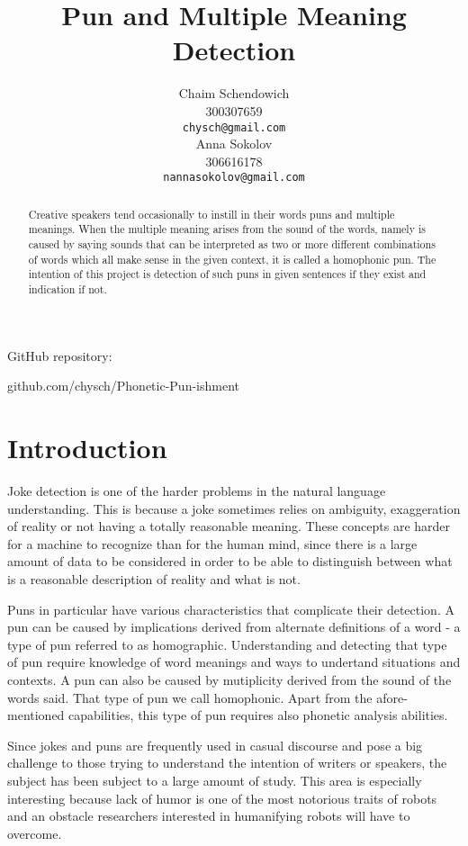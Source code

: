 \documentclass[11pt,a4paper]{article}
\title{Pun and Multiple Meaning Detection}
\author{Chaim Schendowich \\
  300307659 \\
  {\tt chysch@gmail.com} \\\And
  Anna Sokolov \\
  306616178 \\
  {\tt nannasokolov@gmail.com} \\}
\date{}
\begin{document}
\maketitle
\small{
GitHub repository:

github.com/chysch/Phonetic-Pun-ishment}

\hfill

\begin{abstract}
Creative speakers tend occasionally to instill in their words puns and multiple meanings. When the multiple meaning arises from the sound of the words, namely is caused by saying sounds that can be interpreted as two or more different combinations of words which all make sense in the given context, it is called a homophonic pun. The intention of this project is detection of such puns in given sentences if they exist and indication if not.
\end{abstract}

\section{Introduction}

Joke detection is one of the harder problems in the natural language understanding. This is because a joke sometimes relies on ambiguity, exaggeration of reality or not having a totally reasonable meaning. These concepts are harder for a machine to recognize than for the human mind, since there is a large amount of data to be considered in order to be able to distinguish between what is a reasonable description of reality and what is not.

Puns in particular have various characteristics that complicate their detection. A pun can be caused by implications derived from alternate definitions of a word - a type of pun referred to as homographic. Understanding and detecting that type of pun require knowledge of word meanings and ways to undertand situations and contexts. A pun can also be caused by mutiplicity derived from the sound of the words said. That type of pun we call homophonic. Apart from the afore-mentioned capabilities, this type of pun requires also phonetic analysis abilities.

Since jokes and puns are frequently used in casual discourse and pose a big challenge to those trying to understand the intention of writers or speakers, the subject has been subject to a large amount of study. This area is especially interesting because lack of humor is one of the most notorious traits of robots and an obstacle researchers interested in humanifying robots will have to overcome.
\end{document}
